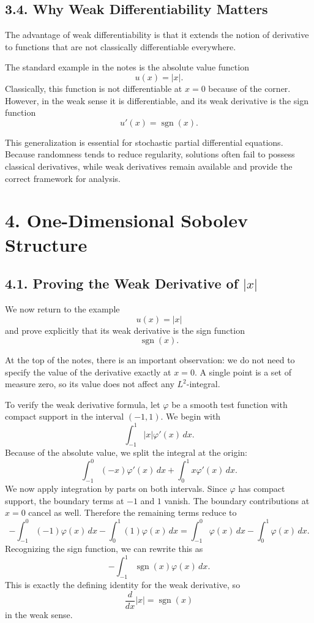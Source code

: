 \documentclass[11pt]{article}
\theoremstyle{definition}
\theoremstyle{remark}
\begin{document}
\subsection*{3.4. Why Weak Differentiability Matters}
The advantage of weak differentiability is that it extends the notion of derivative to functions that are not classically differentiable everywhere.

The standard example in the notes is the absolute value function
\[
u(x)=|x|.
\]
Classically, this function is not differentiable at \(x=0\) because of the corner. However, in the weak sense it is differentiable, and its weak derivative is the sign function
\[
u'(x)=\operatorname{sgn}(x).
\]

This generalization is essential for stochastic partial differential equations. Because randomness tends to reduce regularity, solutions often fail to possess classical derivatives, while weak derivatives remain available and provide the correct framework for analysis.

\section*{4. One-Dimensional Sobolev Structure}

\subsection*{4.1. Proving the Weak Derivative of \(|x|\)}
We now return to the example
\[
u(x)=|x|
\]
and prove explicitly that its weak derivative is the sign function
\[
\operatorname{sgn}(x).
\]

At the top of the notes, there is an important observation: we do not need to specify the value of the derivative exactly at \(x=0\). A single point is a set of measure zero, so its value does not affect any \(L^2\)-integral.

To verify the weak derivative formula, let \(\varphi\) be a smooth test function with compact support in the interval \((-1,1)\). We begin with
\[
\int_{-1}^1 |x|\varphi'(x)\,dx.
\]
Because of the absolute value, we split the integral at the origin:
\[
\int_{-1}^0 (-x)\varphi'(x)\,dx+\int_0^1 x\varphi'(x)\,dx.
\]
We now apply integration by parts on both intervals. Since \(\varphi\) has compact support, the boundary terms at \(-1\) and \(1\) vanish. The boundary contributions at \(x=0\) cancel as well. Therefore the remaining terms reduce to
\[
-\int_{-1}^0 (-1)\varphi(x)\,dx-\int_0^1 (1)\varphi(x)\,dx
=
\int_{-1}^0 \varphi(x)\,dx-\int_0^1 \varphi(x)\,dx.
\]
Recognizing the sign function, we can rewrite this as
\[
-\int_{-1}^1 \operatorname{sgn}(x)\varphi(x)\,dx.
\]
This is exactly the defining identity for the weak derivative, so
\[
\frac{d}{dx}|x|=\operatorname{sgn}(x)
\]
in the weak sense.
\end{document}
